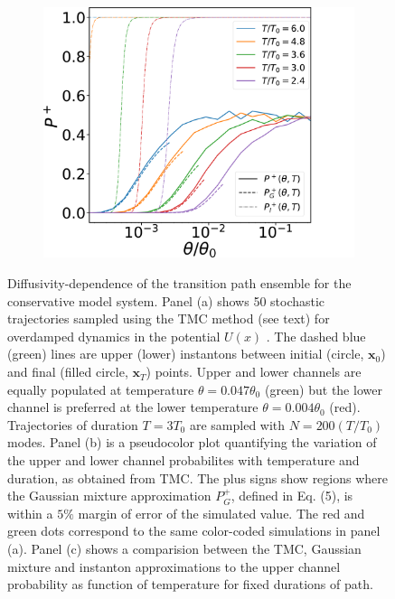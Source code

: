 \begin{figure}
\begin{subfigure}[b]{0.33\textwidth}
        \caption[Extending Cosserat rod]%
        {}    
        \label{fig:extending cosserat rod}
    \end{subfigure}    
    \hfill
    \begin{subfigure}[b]{0.314\textwidth}
        \centering
        \includegraphics[width=\textwidth]{figs_part1/mcmc/switch_channel_rates_line_plot}
        \caption[Extending Cosserat rod]%
        {}    
        \label{fig:extending cosserat rod}
    \end{subfigure}    
    
    \caption[ The average and standard deviation of critical parameters ]
    {\small Diffusivity-dependence of the transition path ensemble for the conservative
model system. Panel (a) shows 50 stochastic trajectories sampled using
the TMC method (see text) for overdamped dynamics in the potential
$U(x)$ \citep{note:SI}. The dashed blue (green) lines are upper
(lower) instantons between initial (circle, $\mathbf{x}_{0}$) and
final (filled circle, $\mathbf{x}_{T}$) points. Upper and lower channels
are equally populated at temperature $\theta=0.047\theta_{0}$ (green)
but the lower channel is preferred at the lower temperature $\theta=0.004\theta_{0}$
(red). Trajectories of duration $T=3T_{0}$ are sampled with $N=200(T/T_{0})$
modes. Panel (b) is a pseudocolor plot quantifying the variation of
the upper and lower channel probabilites with temperature and duration,
as obtained from TMC. The plus signs show regions where the Gaussian
mixture approximation $P_{G}^{+}$, defined in Eq. (5), is within
a $5\%$ margin of error of the simulated value. The red and green
dots correspond to the same color-coded simulations in panel (a).
Panel (c) shows a comparision between the TMC, Gaussian mixture and
instanton approximations to the upper channel probability as function
of temperature for fixed durations of path.} 
    \label{fig:switch}
\end{figure} 


